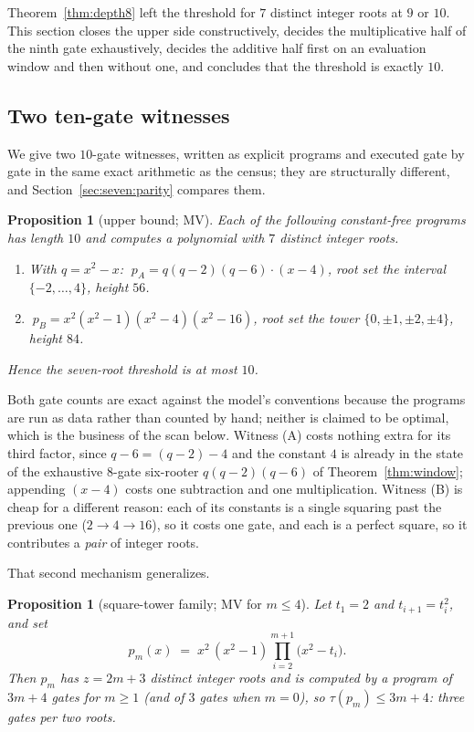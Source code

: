 \documentclass[11pt]{article}
\newtheorem{proposition}[theorem]{Proposition}
\theoremstyle{definition}
\theoremstyle{remark}
\begin{document}
Theorem~\ref{thm:depth8} left the threshold for $7$ distinct integer roots at
$9$ or $10$. This section closes the upper side constructively, decides the
multiplicative half of the ninth gate exhaustively, decides the additive half first
on an evaluation window and then without one, and concludes that the threshold is
exactly $10$.

\subsection{Two ten-gate witnesses}\label{sec:seven:upper}

We give two $10$-gate witnesses, written as explicit programs and executed gate by
gate in the same exact arithmetic as the census; they are structurally different,
and Section~\ref{sec:seven:parity} compares them.

\begin{proposition}[upper bound; MV]\label{prop:ten}
Each of the following constant-free programs has length $10$ and computes a
polynomial with $7$ distinct integer roots.
\begin{enumerate}
\item[(A)] With $q = x^2 - x$: $\; p_A = q(q-2)(q-6)\cdot(x-4)$, root set the
interval $\{-2,\dots,4\}$, height $56$.
\item[(B)] $\; p_B = x^2(x^2-1)(x^2-4)(x^2-16)$, root set the tower
$\{0,\pm1,\pm2,\pm4\}$, height $84$.
\end{enumerate}
Hence the seven-root threshold is at most $10$.
\end{proposition}

Both gate counts are exact against the model's conventions because the programs
are run as data rather than counted by hand; neither is claimed to be optimal,
which is the business of the scan below. Witness (A) costs nothing extra for its
third factor, since $q - 6 = (q-2) - 4$ and the constant $4$ is already in the
state of the exhaustive $8$-gate six-rooter $q(q-2)(q-6)$ of
Theorem~\ref{thm:window}; appending $(x-4)$ costs one subtraction and one
multiplication. Witness (B) is cheap for a different reason: each of its
constants is a single squaring past the previous one ($2 \to 4 \to 16$), so it
costs one gate, and each is a perfect square, so it contributes a
\emph{pair} of integer roots.

That second mechanism generalizes.

\begin{proposition}[square-tower family; MV for $m \le 4$]\label{prop:tower}
Let $t_1 = 2$ and $t_{i+1} = t_i^2$, and set
\[
  p_m(x) \;=\; x^2\,(x^2-1)\prod_{i=2}^{m+1}\bigl(x^2 - t_i\bigr).
\]
Then $p_m$ has $z = 2m+3$ distinct integer roots and is computed by a program of $3m+4$ gates for $m \ge 1$ (and of $3$ gates when $m = 0$), so
$\tau(p_m) \le 3m+4$: three gates per two roots.
\end{proposition}
\end{document}
